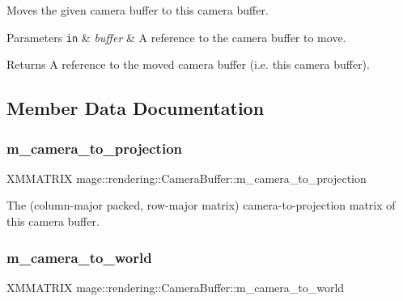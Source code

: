 Moves the given camera buffer to this camera buffer.


\begin{DoxyParams}[1]{Parameters}
\mbox{\tt in}  & {\em buffer} & A reference to the camera buffer to move. \\
\hline
\end{DoxyParams}
\begin{DoxyReturn}{Returns}
A reference to the moved camera buffer (i.\+e. this camera buffer). 
\end{DoxyReturn}


\subsection{Member Data Documentation}
\mbox{\label{structmage_1_1rendering_1_1_camera_buffer_a75669aa0916514b1d414e5a2f7c72c75}} 
\subsubsection{\texorpdfstring{m\+\_\+camera\+\_\+to\+\_\+projection}{m\_camera\_to\_projection}}
{\footnotesize\ttfamily X\+M\+M\+A\+T\+R\+IX mage\+::rendering\+::\+Camera\+Buffer\+::m\+\_\+camera\+\_\+to\+\_\+projection}

The (column-\/major packed, row-\/major matrix) camera-\/to-\/projection matrix of this camera buffer. \mbox{\label{structmage_1_1rendering_1_1_camera_buffer_a0633cfc689f2a097783ecc1626b94590}} 
\subsubsection{\texorpdfstring{m\+\_\+camera\+\_\+to\+\_\+world}{m\_camera\_to\_world}}
{\footnotesize\ttfamily X\+M\+M\+A\+T\+R\+IX mage\+::rendering\+::\+Camera\+Buffer\+::m\+\_\+camera\+\_\+to\+\_\+world}

